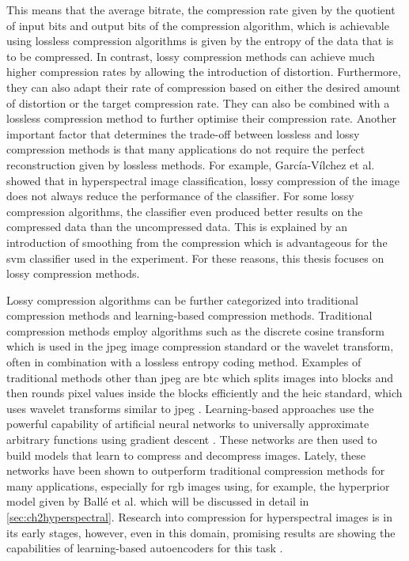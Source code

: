 This means that the average bitrate, the compression rate given by the quotient of input bits and output bits of the compression algorithm, which is achievable using lossless compression algorithms is given by the entropy of the data that is to be compressed.
In contrast, lossy compression methods can achieve much higher compression rates by allowing the introduction of distortion. Furthermore, they can also adapt their rate of compression based on either the desired amount of distortion or the target compression rate. They can also be combined with a lossless compression method to further optimise their compression rate. 
Another important factor that determines the trade-off between lossless and lossy compression methods is that many applications do not require the perfect reconstruction given by lossless methods. For example, García-Vílchez et al. \citep{garcia-vilchez_impact_2011} showed that in hyperspectral image classification, lossy compression of the image does not always reduce the performance of the classifier. For some lossy compression algorithms, the classifier even produced better results on the compressed data than the uncompressed data. This is explained by an introduction of smoothing from the compression which is advantageous for the \ac{svm} classifier used in the experiment. 
For these reasons, this thesis focuses on lossy compression methods.

Lossy compression algorithms can be further categorized into traditional compression methods and learning-based compression methods. Traditional compression methods employ algorithms such as the discrete cosine transform which is used in the \ac{jpeg} image compression standard or the wavelet transform, often in combination with a lossless entropy coding method. Examples of traditional methods other than \ac{jpeg} are \ac{btc} which splits images into blocks and then rounds pixel values inside the blocks efficiently and the \ac{heic} standard, which uses wavelet transforms similar to \ac{jpeg} \citep{delp_image_1979,hannuksela_high_2015}. Learning-based approaches use the powerful capability of artificial neural networks to universally approximate arbitrary functions using gradient descent \citep{ruder_overview_2017}. These networks are then used to build models that learn to compress and decompress images. Lately, these networks have been shown to outperform traditional compression methods for many applications, especially for \ac{rgb} images using, for example, the hyperprior model given by Ballé et al.\citep{balle_end--end_2017,balle_variational_2018,minnen_joint_2018} which will be discussed in detail in \autoref{sec:ch2hyperspectral}. 
Research into compression for hyperspectral images is in its early stages, however, even in this domain, promising results are showing the capabilities of learning-based autoencoders for this task \citep{kuester_1d-convolutional_2021,kuester_transferability_2022,la_grassa_hyperspectral_2022,guo_learned_2021}.

